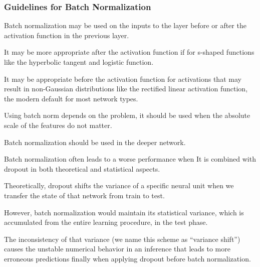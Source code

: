 	\subsubsection{Guidelines for Batch Normalization}
	\begin{bulletedlist}
		\item Batch normalization may be used on the inputs to the layer before or after the activation function in the previous layer.
		\item It may be more appropriate after the activation function if for s-shaped functions like the hyperbolic tangent and logistic function.
		\item It may be appropriate before the activation function for activations that may result in non-Gaussian distributions like the rectified linear activation function, the modern default for most network types.
		\item Using batch norm depends on the problem, it should be used when the absolute scale of the features do not matter.
		\item Batch normalization should be used in the deeper network.
		\item Batch normalization often leads to a worse performance when It is combined with dropout in both theoretical and statistical aspects.
		\item Theoretically, dropout shifts the variance of a specific neural unit when we transfer the state of that network from train to test.
		\item However, batch normalization would maintain its statistical variance, which is accumulated from the entire learning procedure, in the test phase.
		\item The inconsistency of that variance (we name this scheme as ``variance shift'') causes the unstable numerical behavior in an inference that leads to more erroneous predictions finally when applying dropout before batch normalization.
	\end{bulletedlist}

